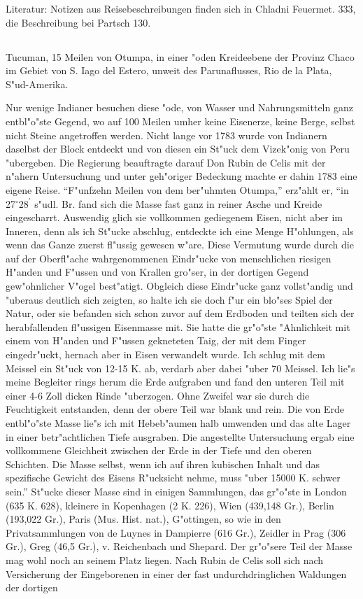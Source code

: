 \documentclass[a4paper, 11pt, oneside]{article}
\begin{document}
\normalsize
Literatur: Notizen aus Reisebeschreibungen finden sich in Chladni Feuermet. 333, die Beschreibung bei Partsch 130.

\LARGE
\subsection{}

Tucuman, 15 Meilen von Otumpa, in einer "oden Kreideebene
der Provinz Chaco im Gebiet von S. Iago del Estero, unweit des Parunaflusses, Rio de la Plata, S"ud-Amerika.

Nur wenige Indianer besuchen diese "ode, von Wasser und Nahrungsmitteln ganz entbl"o"ste Gegend, wo auf 100 Meilen umher keine Eisenerze, keine Berge, selbst nicht Steine angetroffen werden. Nicht lange vor 1783 wurde von Indianern daselbst der Block entdeckt und von diesen ein St"uck dem Vizek"onig von Peru "ubergeben. Die Regierung beauftragte darauf Don Rubin de Celis mit der n"ahern Untersuchung und unter geh"origer Bedeckung machte er dahin 1783 eine eigene Reise. "`F"unfzehn Meilen von dem ber"uhmten Otumpa,"' erz"ahlt er, "`in 27$^\circ28^\prime$ s"udl. Br. fand sich die Masse fast ganz in reiner Asche und Kreide eingescharrt. Auswendig glich sie vollkommen gediegenem Eisen, nicht aber im Inneren, denn als ich St"ucke abschlug, entdeckte ich eine Menge H"ohlungen, als wenn das Ganze zuerst fl"ussig gewesen w"are. Diese Vermutung wurde durch die auf der Oberfl"ache wahrgenommenen Eindr"ucke von menschlichen riesigen H"anden und F"ussen und von Krallen gro"ser, in der dortigen Gegend gew"ohnlicher V"ogel best"atigt. Obgleich diese Eindr"ucke ganz vollst"andig und "uberaus deutlich sich zeigten, so halte ich sie doch f"ur ein blo"ses Spiel der Natur, oder sie befanden sich schon zuvor auf dem Erdboden und teilten sich der herabfallenden fl"ussigen Eisenmasse mit. Sie hatte die gr"o"ste "Ahnlichkeit mit einem von H"anden und F"ussen gekneteten Taig, der mit dem Finger eingedr"uckt, hernach aber in Eisen verwandelt wurde. Ich schlug mit dem Meissel ein St"uck von 12-15 K. ab, verdarb aber dabei "uber 70 Meissel. Ich lie"s meine Begleiter rings herum die Erde aufgraben und fand den unteren Teil mit einer 4-6 Zoll dicken Rinde "uberzogen. Ohne Zweifel war sie durch die Feuchtigkeit entstanden, denn der obere Teil war blank und rein. Die von Erde entbl"o"ste Masse lie"s ich mit Hebeb"aumen halb umwenden und das alte Lager in einer betr"achtlichen Tiefe ausgraben. Die angestellte Untersuchung ergab eine vollkommene Gleichheit zwischen der Erde in der Tiefe und den oberen Schichten. Die Masse selbst, wenn ich auf ihren kubischen Inhalt und das spezifische Gewicht des Eisens R"ucksicht nehme, muss "uber 15000 K. schwer sein."' St"ucke dieser Masse sind in einigen Sammlungen, das gr"o"ste in London (635 K. 628), kleinere in Kopenhagen (2 K. 226), Wien (439,148 Gr.), Berlin (193,022 Gr.), Paris (Mus. Hist. nat.), G"ottingen, so wie in den Privatsammlungen von de Luynes in Dampierre (616 Gr.), Zeidler in Prag (306 Gr.), Greg (46,5 Gr.), v. Reichenbach und Shepard. Der gr"o"sere Teil der Masse mag wohl noch an seinem Platz liegen. Nach Rubin de Celis soll sich nach Versicherung der Eingeborenen in einer der fast undurchdringlichen Waldungen der dortigen 
\end{document}
